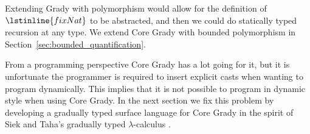 Extending Grady with polymorphism would allow for the definition of
$\lstinline{fixNat}$ to be abstracted, and then we could do statically
typed recursion at any type.  We extend Core Grady with bounded
polymorphism in Section~\ref{sec:bounded_quantification}.

From a programming perspective Core Grady has a lot going for it, but
it is unfortunate the programmer is required to insert explicit casts
when wanting to program dynamically.  This implies that it is not
possible to program in dynamic style when using Core Grady.  In the
next section we fix this problem by developing a gradually typed
surface language for Core Grady in the spirit of Siek and Taha's
gradually typed $\lambda$-calculus \cite{Siek:2006}.

